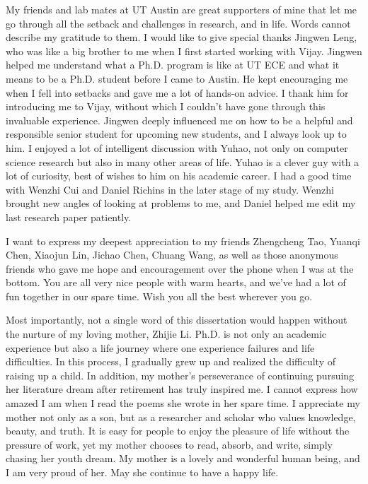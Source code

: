 \begin{acknowledgments}
My friends and lab mates at UT Austin are great supporters of mine that let me go through all the setback and challenges in research, and in life. Words cannot describe my gratitude to them. I would like to give special thanks Jingwen Leng, who was like a big brother to me when I first started working with Vijay. Jingwen helped me understand what a Ph.D. program is like at UT ECE and what it means to be a Ph.D. student before I came to Austin. He kept encouraging me when I fell into setbacks and gave me a lot of hands-on advice. I thank him for introducing me to Vijay, without which I couldn't have gone through this invaluable experience. Jingwen deeply influenced me on how to be a helpful and responsible senior student for upcoming new students, and I always look up to him. I enjoyed a lot of intelligent discussion with Yuhao, not only on computer science research but also in many other areas of life. Yuhao is a clever guy with a lot of curiosity, best of wishes to him on his academic career. I had a good time with Wenzhi Cui and Daniel Richins in the later stage of my study. Wenzhi brought new angles of looking at problems to me, and Daniel helped me edit my last research paper patiently.

I want to express my deepest appreciation to my friends Zhengcheng Tao, Yuanqi Chen, Xiaojun Lin, Jichao Chen, Chuang Wang, as well as those anonymous friends who gave me hope and encouragement over the phone when I was at the bottom. You are all very nice people with warm hearts, and we've had a lot of fun together in our spare time. Wish you all the best wherever you go.

Most importantly, not a single word of this dissertation would happen without the nurture of my loving mother, Zhijie Li. Ph.D. is not only an academic experience but also a life journey where one experience failures and life difficulties. In this process, I gradually grew up and realized the difficulty of raising up a child. In addition, my mother's perseverance of continuing pursuing her literature dream after retirement has truly inspired me. I cannot express how amazed I am when I read the poems she wrote in her spare time. I appreciate my mother not only as a son, but as a researcher and scholar who values knowledge, beauty, and truth. It is easy for people to enjoy the pleasure of life without the pressure of work, yet my mother chooses to read, absorb, and write, simply chasing her youth dream. My mother is a lovely and wonderful human being, and I am very proud of her. May she continue to have a happy life.


\end{acknowledgments}
